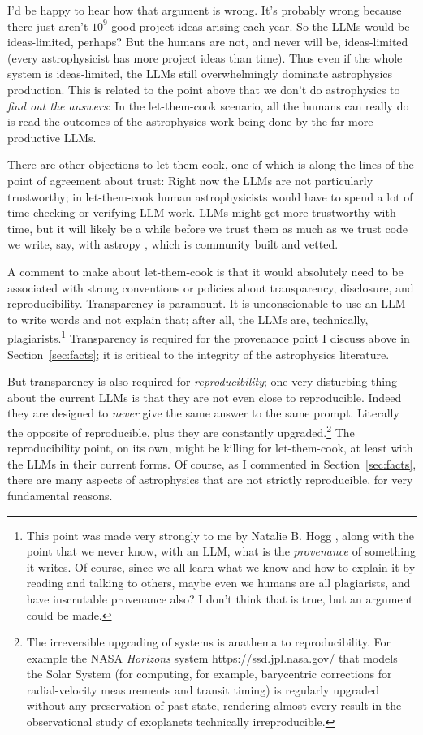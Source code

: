 \documentclass{article}
\newcommand{\sectionname}{Section}
\newcommand{\secref}[1]{\sectionname~\ref{#1}}
\begin{document}
I'd be happy to hear how that argument is wrong.
It's probably wrong because there just aren't $10^9$ good project ideas arising each year.
So the LLMs would be ideas-limited, perhaps?
But the humans are not, and never will be, ideas-limited (every astrophysicist has more project ideas than time).
Thus even if the whole system is ideas-limited, the LLMs still overwhelmingly dominate astrophysics production.
This is related to the point above that we don't do astrophysics to \emph{find out the answers}:
In the let-them-cook scenario, all the humans can really do is read the outcomes of the astrophysics work being done by the far-more-productive LLMs.

There are other objections to let-them-cook, one of which is along the lines of the point of agreement about trust:
Right now the LLMs are not particularly trustworthy; in let-them-cook human astrophysicists would have to spend a lot of time checking or verifying LLM work.
LLMs might get more trustworthy with time, but it will likely be a while before we trust them as much as we trust code we write, say, with astropy \cite{astropy}, which is community built and vetted.

A comment to make about let-them-cook is that it would absolutely need to be associated with strong conventions or policies about transparency, disclosure, and reproducibility.
Transparency is paramount.
It is unconscionable to use an LLM to write words and not explain that; after all, the LLMs are, technically, plagiarists.\footnote{%
This point was made very strongly to me by Natalie B. Hogg \cite{natalie}, along with the point that we never know, with an LLM, what is the \emph{provenance} of something it writes.
Of course, since we all learn what we know and how to explain it by reading and talking to others, maybe even we humans are all plagiarists, and have inscrutable provenance also?
I don't think that is true, but an argument could be made.}
Transparency is required for the provenance point I discuss above in \secref{sec:facts}; it is critical to the integrity of the astrophysics literature.

But transparency is also required for \emph{reproducibility};
one very disturbing thing about the current LLMs is that they are not even close to reproducible.
Indeed they are designed to \emph{never} give the same answer to the same prompt.
Literally the opposite of reproducible, plus they are constantly upgraded.\footnote{%
The irreversible upgrading of systems is anathema to reproducibility.
For example the NASA \textsl{Horizons} system \url{https://ssd.jpl.nasa.gov/} that models the Solar System (for computing, for example, barycentric corrections for radial-velocity measurements and transit timing) is regularly upgraded without any preservation of past state, rendering almost every result in the observational study of exoplanets technically irreproducible.}
The reproducibility point, on its own, might be killing for let-them-cook, at least with the LLMs in their current forms.
Of course, as I commented in \secref{sec:facts}, there are many aspects of astrophysics that are not strictly reproducible, for very fundamental reasons.
\end{document}
